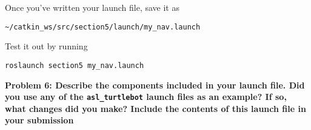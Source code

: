 \documentclass{article}
\begin{document}
Once you've written your launch file, save it as


\begin{lstlisting}
~/catkin_ws/src/section5/launch/my_nav.launch
\end{lstlisting}


Test it out by running


\begin{lstlisting}
roslaunch section5 my_nav.launch
\end{lstlisting}


\textbf{Problem 6: Describe the components included in your launch file. Did you use any of the \texttt{asl\_turtlebot} launch files as an example? If so, what changes did you make? Include the contents of this launch file in your submission}
\end{document}

